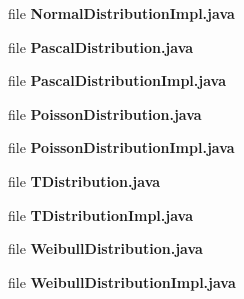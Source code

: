 \begin{DoxyCompactItemize}
file {\bfseries Normal\-Distribution\-Impl.\-java}
\item 
file {\bfseries Pascal\-Distribution.\-java}
\item 
file {\bfseries Pascal\-Distribution\-Impl.\-java}
\item 
file {\bfseries Poisson\-Distribution.\-java}
\item 
file {\bfseries Poisson\-Distribution\-Impl.\-java}
\item 
file {\bfseries T\-Distribution.\-java}
\item 
file {\bfseries T\-Distribution\-Impl.\-java}
\item 
file {\bfseries Weibull\-Distribution.\-java}
\item 
file {\bfseries Weibull\-Distribution\-Impl.\-java}
\end{DoxyCompactItemize}
